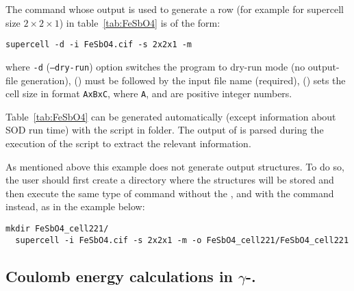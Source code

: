 \documentclass[a4paper,10pt]{article}
\begin{document}
The \sups{} command whose output is used to generate a row (for example for supercell size $2\times2\times1$) in table~\ref{tab:FeSbO4} is of the form:
\begin{Verbatim}[breaklines]
  supercell -d -i FeSbO4.cif -s 2x2x1 -m 
\end{Verbatim}
where \texttt{-d} (\texttt{--dry-run}) option switches the program to dry-run mode (no output-file generation),  () must be followed by the input file name (required),  () sets the cell size in format \texttt{AxBxC}, where \texttt{A},  and  are positive integer numbers.

Table~\ref{tab:FeSbO4} can be generated automatically (except information about SOD run time) with the script \linebreak {} in  folder. The output of \sups{} is parsed during the execution of the script to extract the relevant information.

As mentioned above this example does not generate output structures. To do so, the user should first create a directory where the structures will be stored and then execute the same type of \sups{} command without the , and with the  command instead, as in the example below:
\begin{Verbatim}[breaklines]
  mkdir FeSbO4_cell221/
  supercell -i FeSbO4.cif -s 2x2x1 -m -o FeSbO4_cell221/FeSbO4_cell221
\end{Verbatim}

\subsection*{Coulomb energy calculations in $\gamma$-.}
\end{document}
